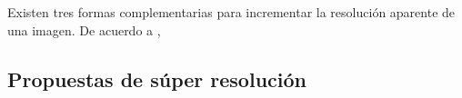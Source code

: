 Existen tres formas complementarias para incrementar la resolución aparente 
de una imagen. De acuerdo a \cite{freeman},

\subsection{Propuestas de súper resolución}